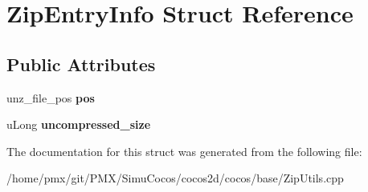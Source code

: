 \hypertarget{structZipEntryInfo}{}\section{Zip\+Entry\+Info Struct Reference}
\label{structZipEntryInfo}
\subsection*{Public Attributes}
\begin{DoxyCompactItemize}
\item 
\mbox{\label{structZipEntryInfo_ab38eb646f013941fb93cb32aa94da87a}} 
unz\+\_\+file\+\_\+pos {\bfseries pos}
\item 
\mbox{\label{structZipEntryInfo_a592c0c2d21128d8ec379e840cd053302}} 
u\+Long {\bfseries uncompressed\+\_\+size}
\end{DoxyCompactItemize}


The documentation for this struct was generated from the following file\+:\begin{DoxyCompactItemize}
\item 
/home/pmx/git/\+P\+M\+X/\+Simu\+Cocos/cocos2d/cocos/base/Zip\+Utils.\+cpp\end{DoxyCompactItemize}
